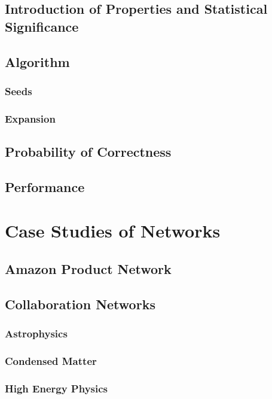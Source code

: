 \documentclass[phd,tocprelim]{cornell}
\begin{document}
\section {Introduction of Properties and Statistical Significance}

\section{Algorithm}

\subsection{Seeds}

\subsection{Expansion}

\section{Probability of Correctness}

\section {Performance}

\chapter{Case Studies of Networks}

\section{Amazon Product Network}



\section{Collaboration Networks}

\subsection{Astrophysics}

\subsection{Condensed Matter}

\subsection{High Energy Physics}
\end{document}
